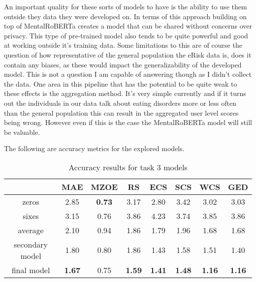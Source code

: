 \documentclass[12pt, titlepage]{article}
\begin{document}
An important quality for these sorts of models to have is the ability to use them outside they data they were developed on. In terms of this approach building on top of MentalRoBERTa creates a model that can be shared without concerns over privacy. This type of pre-trained model also tends to be quite powerful and good at working outside it's training data. Some limitations to this are of course the question of how representative of the general population the eRisk data is, does it contain any biases, as these would impact the generalizability of the developed model. This is not a question I am capable of answering though as I didn't collect the data. One area in this pipeline that has the potential to be quite weak to these effects is the aggregation method. It's very simple currently and if it turns out the individuals in our data talk about eating disorders more or less often than the general population this can result in the aggregated user level scores being wrong. However even if this is the case the MentalRoBERTa model will still be valuable.

The following are accuracy metrics for the explored models.

\begin{table}[H]
\begin{tabular}{c|ccccccc}                                                                                                                                                                                                                          
  &  MAE   & MZOE  & RS    & ECS   & SCS   & WCS   & GED \\ \hline
zeros  & 2.85  & \textbf{0.73}  & 3.17  & 2.80  & 3.42  & 3.02  & 3.03 \\
sixes  & 3.15  & 0.76  & 3.86  & 4.23  & 3.74  & 3.85  & 3.86 \\
average & 2.10  & 0.94  & 1.86  & 1.79  & 1.96  & 1.68  & 1.68 \\
secondary model  & 1.80  & 0.80  & 1.86  & 1.43  & 1.58  & 1.51  & 1.40 \\
final model  & \textbf{1.67}  & 0.75  & \textbf{1.59}  & \textbf{1.41}  & \textbf{1.48}  & \textbf{1.16} & \textbf{1.16} \\
\end{tabular}
\caption{Accuracy results for task 3 models}
\label{T3Acc}
\end{table}
\end{document}
